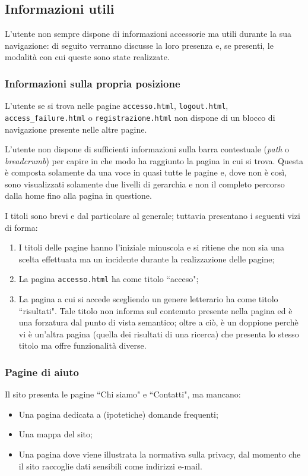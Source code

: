 \subsection{Informazioni utili}
L'utente non sempre dispone di informazioni accessorie ma utili durante la sua
navigazione: di seguito verranno discusse la loro presenza e, se presenti, le
modalità con cui queste sono state realizzate.

\subsubsection{Informazioni sulla propria posizione}\label{sec:user-posiz}
L'utente se si trova nelle pagine \texttt{accesso.html}, \texttt{logout.html},
\texttt{access\_failure.html} o \texttt{registrazione.html} non dispone di un
blocco di navigazione presente nelle altre pagine.

L'utente non dispone di sufficienti informazioni sulla barra contestuale
(\textit{path} o \textit{breadcrumb}) per capire in che modo ha raggiunto la
pagina in cui si trova. Questa è composta solamente da una voce in quasi tutte
le pagine e, dove non è così, sono visualizzati solamente due livelli di
gerarchia e non il completo percorso dalla home fino alla pagina in questione.

I titoli sono brevi e dal particolare al generale; tuttavia presentano i
seguenti vizi di forma:
\begin{enumerate}
\item I titoli delle pagine hanno l'iniziale minuscola e si ritiene che non sia
una scelta effettuata ma un incidente durante la realizzazione delle pagine;
\item La pagina \texttt{accesso.html} ha come titolo ``acceso";
\item La pagina a cui si accede scegliendo un genere letterario ha come titolo
``risultati". Tale titolo non informa sul contenuto presente nella pagina ed è
una forzatura dal punto di vista semantico; oltre a ciò, è un doppione perchè
vi è un'altra pagina (quella dei risultati di una ricerca) che presenta lo
stesso titolo ma offre funzionalità diverse.
\end{enumerate}

\subsubsection{Pagine di aiuto}
Il sito presenta le pagine ``Chi siamo" e ``Contatti", ma mancano:
\begin{itemize}
\item Una pagina dedicata a (ipotetiche) domande frequenti;
\item Una mappa del sito;
\item Una pagina dove viene illustrata la normativa sulla privacy, dal momento
che il sito raccoglie dati sensibili come indirizzi e-mail.
\end{itemize}

